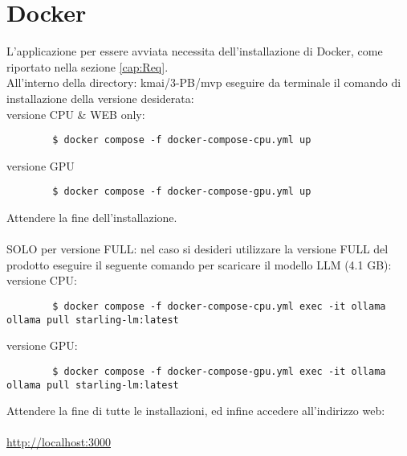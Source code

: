 \section{Docker}
L'applicazione per essere avviata necessita dell'installazione di Docker, come riportato nella sezione \ref{cap:Req}.\\
All'interno della directory: kmai/3-PB/mvp eseguire da terminale il comando di installazione della versione desiderata: \\
versione CPU \& WEB only:
    \begin{lstlisting}
        $ docker compose -f docker-compose-cpu.yml up
    \end{lstlisting}
versione GPU
    \begin{lstlisting}
        $ docker compose -f docker-compose-gpu.yml up
    \end{lstlisting}
Attendere la fine dell'installazione.\\\\
SOLO per versione FULL: nel caso si desideri utilizzare la versione FULL del prodotto eseguire il seguente comando per scaricare il modello LLM (4.1 GB):\\
versione CPU:
    \begin{lstlisting}
        $ docker compose -f docker-compose-cpu.yml exec -it ollama ollama pull starling-lm:latest
    \end{lstlisting}
versione GPU:
    \begin{lstlisting}
        $ docker compose -f docker-compose-gpu.yml exec -it ollama ollama pull starling-lm:latest
    \end{lstlisting}
Attendere la fine di tutte le installazioni, ed infine accedere all'indirizzo web: \\ \\
\url{http://localhost:3000}
